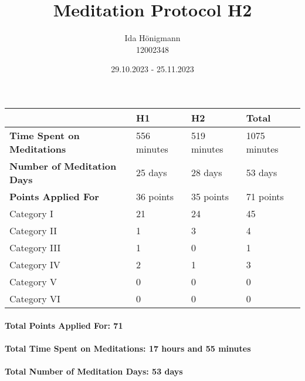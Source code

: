 \documentclass[11pt,a4paper]{article}
\begin{document}
\afterpage{\restorepagecolor}
\title{\LARGE\bfseries Meditation Protocol H2}
\author{Ida Hönigmann \\ 12002348}
\date{29.10.2023 - 25.11.2023}
\maketitle

\begin{tabular}{l|l|l|l}
	                                   & \textbf{H1} & \textbf{H2} & \textbf{Total}\\
	\hline
	\textbf{Time Spent on Meditations} & 556 minutes & 519 minutes & 1075 minutes  \\
	\textbf{Number of Meditation Days} & 25 days     & 28 days     & 53 days       \\
	\textbf{Points Applied For}        & 36 points   & 35 points   & 71 points     \\
	\hline
	Category I                         & 21          & 24          & 45            \\
	Category II                        & 1           & 3           & 4             \\
	Category III                       & 1           & 0           & 1             \\
	Category IV                        & 2           & 1           & 3             \\
	Category V                         & 0           & 0           & 0             \\
	Category VI                        & 0           & 0           & 0             \\
\end{tabular}

\paragraph{Total Points Applied For: 71}
\paragraph{Total Time Spent on Meditations: 17 hours and 55 minutes}
\paragraph{Total Number of Meditation Days: 53 days}

\end{document}
